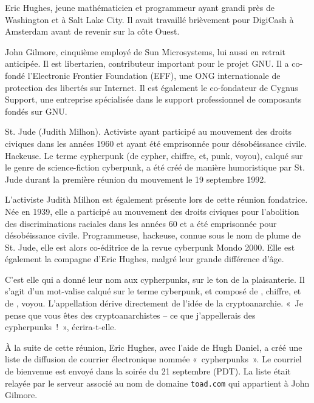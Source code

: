Eric Hughes, jeune mathématicien et programmeur ayant grandi près de Washington et à Salt Lake City. Il avait travaillé brièvement pour DigiCash à Amsterdam avant de revenir sur la côte Ouest.

John Gilmore, cinquième employé de Sun Microsystems, lui aussi en retrait anticipée. Il est libertarien, contributeur important pour le projet GNU. Il a co-fondé l'Electronic Frontier Foundation (EFF), une ONG internationale de protection des libertés sur Internet. Il est également le co-fondateur de Cygnus Support, une entreprise spécialisée dans le support professionnel de composants fondés sur GNU. %

St. Jude (Judith Milhon). Activiste ayant participé au mouvement des droits civiques dans les années 1960 et ayant été emprisonnée pour désobéissance civile. Hackeuse. Le terme cypherpunk (de cypher, chiffre, et, punk, voyou), calqué sur le genre de science-fiction cyberpunk, a été créé de manière humoristique par St. Jude durant la première réunion du mouvement le 19 septembre 1992.

L'activiste Judith Milhon est également présente lors de cette réunion fondatrice. Née en 1939, elle a participé au mouvement des droits civiques pour l'abolition des discriminations raciales dans les années 60 et a été emprisonnée pour désobéissance civile. Programmeuse, hackeuse, connue sous le nom de plume de St. Jude, elle est alors co-éditrice de la revue cyberpunk Mondo 2000. Elle est également la compagne d'Eric Hughes, malgré leur grande différence d'âge.

C'est elle qui a donné leur nom aux cypherpunks, sur le ton de la plaisanterie. Il s'agit d'un mot-valise calqué sur le terme cyberpunk, et composé de , chiffre, et de , voyou. L'appellation dérive directement de l'idée de la cryptoanarchie. «~Je pense que vous êtes des cryptoanarchistes -- ce que j'appellerais des cypherpunks~!~», écrira-t-elle.

À la suite de cette réunion, Eric Hughes, avec l'aide de Hugh Daniel, a créé une liste de diffusion de courrier électronique nommée «~cypherpunks~». Le courriel de bienvenue est envoyé dans la soirée du 21 septembre (PDT). La liste était relayée par le serveur associé au nom de domaine \texttt{toad.com} qui appartient à John Gilmore.

